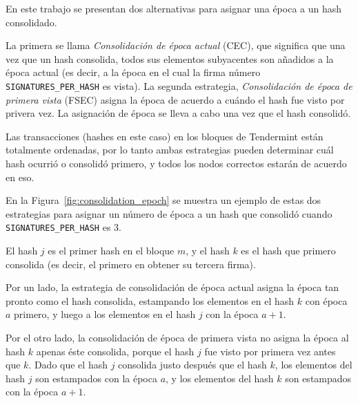 %
%

%

En este trabajo se presentan dos alternativas para asignar una época a un hash consolidado.

%
La primera se llama \textit{Consolidación de época actual} (CEC), que significa que 
una vez que un hash consolida, todos sus elementos subyacentes son añadidos a la época actual
(es decir, a la época en el cual la firma número \texttt{SIGNATURES\_PER\_HASH} es vista).
%
La segunda estrategia, \textit{Consolidación de época de primera vista} (FSEC) asigna la época
de acuerdo a cuándo el hash fue visto por privera vez. La asignación de época se lleva
a cabo una vez que el hash consolidó. 

%
Las transacciones (hashes en este caso) en los bloques de Tendermint están totalmente ordenadas,
por lo tanto ambas estrategias pueden determinar cuál hash ocurrió o consolidó primero, y
todos los nodos correctos estarán de acuerdo en eso.

%

En la Figura~\ref{fig:consolidation_epoch} se muestra un ejemplo de estas dos estrategias para asignar
un número de época a un hash que consolidó cuando \texttt{SIGNATURES\_PER\_HASH} es 3.

%
El hash $j$ es el primer hash en el bloque $m$, y el hash $k$ es el hash que primero consolida
(es decir, el primero en obtener su tercera firma).

%
Por un lado, la estrategia de consolidación de época actual asigna la época tan pronto como
el hash consolida, estampando los elementos en el hash $k$ con época $a$ primero, y luego
a los elementos en el hash $j$ con la época $a+1$.

%
Por el otro lado, la consolidación de época de primera vista no asigna la época al hash $k$
apenas éste consolida, porque el hash $j$ fue visto por primera vez antes que $k$.
%
Dado que el hash $j$ consolida justo después que el hash $k$, los elementos del hash $j$ son
estampados
con la época $a$, y los elementos del hash $k$ son estampados con la época $a+1$. 


